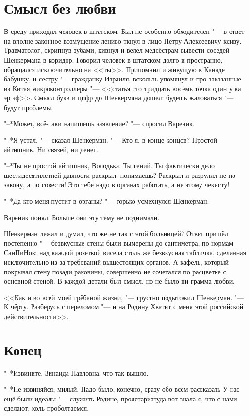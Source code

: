 \section{Смысл без любви}

В среду приходил человек в штатском.
Был не особенно обходителен "--- в ответ на вполне законное возмущение лениво ткнул в лицо Петру Алексеевичу ксиву.
Травматолог, скрипнув зубами, кивнул и велел медсёстрам вывести соседей Шенкермана в коридор.
Говорил человек в штатском долго и пространно, обращался исключительно на <<ты>>.
Припомнил и живущую в Канаде бабушку, и сестру "--- гражданку Израиля, вскользь упомянул и про заказанные из Китая микроконтроллеры "--- <<статья сто тридцать восемь точка один у ка эр эф>>.
Смысл букв и цифр до Шенкермана дошёл: будешь жаловаться "--- будут проблемы.

"--*Может, всё-таки напишешь заявление? "--- спросил Вареник.

"--*Я устал, "--- сказал Шенкерман.
"--- Кто я, в конце концов?
Простой айтишник.
Ни связей, ни денег.

"--*Ты не простой айтишник, Володька.
Ты гений.
Ты фактически дело шестидесятилетней давности раскрыл, понимаешь?
Раскрыл и разрулил не по закону, а по совести!
Это тебе надо в органах работать, а не этому чекисту!

"--*Да кто меня пустит в органы? "--- горько усмехнулся Шенкерман.

Вареник понял.
Больше они эту тему не поднимали.

Шенкерман лежал и думал, что же не так с этой больницей?
Ответ пришёл постепенно "--- безвкусные стены были вымерены до сантиметра, по нормам СанПиНов;
над каждой розеткой висела столь же безвкусная табличка, сделанная исключительно из-за требований вышестоящих органов.
А кафель, который покрывал стену позади раковины, совершенно не сочетался по расцветке с основной стеной.
В каждой детали был смысл, но не было ни грамма любви.

<<Как и во всей моей грёбаной жизни, "--- грустно подытожил Шенкерман.
"--- К чёрту.
Разберусь с переломом "--- и на Родину\ldotst
Хватит с меня этой российской действительности>>.

\section{Конец}

"--*Извините, Зинаида Павловна, что так вышло.

"--*Не извиняйся, милый.
Надо было, конечно, сразу обо всём рассказать\ldotst
У нас ещё были идеалы "--- служить Родине, пролетариату\ldotst да вот знала я, что с нами сделают, коль проболтаемся.

